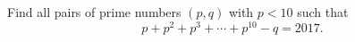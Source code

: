 Find all pairs of prime numbers $(p,q)$ with $p<10$ such that
\[
p+p^2+p^3+\cdots+p^{10}-q=2017 .
\]
